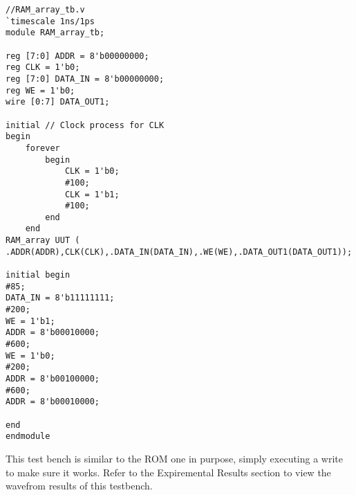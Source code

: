 \documentclass[12pt]{article}
\begin{document}
		\begin{Verbatim}[frame=single, fontsize= \small]
//RAM_array_tb.v
`timescale 1ns/1ps
module RAM_array_tb;

reg [7:0] ADDR = 8'b00000000;
reg CLK = 1'b0;
reg [7:0] DATA_IN = 8'b00000000;
reg WE = 1'b0;
wire [0:7] DATA_OUT1;

initial // Clock process for CLK
begin
	forever 
		begin
			CLK = 1'b0;
			#100;
			CLK = 1'b1; 
			#100;
		end
	end
RAM_array UUT (
.ADDR(ADDR),CLK(CLK),.DATA_IN(DATA_IN),.WE(WE),.DATA_OUT1(DATA_OUT1));

initial begin
#85;
DATA_IN = 8'b11111111;
#200;
WE = 1'b1;
ADDR = 8'b00010000;
#600;
WE = 1'b0;
#200;
ADDR = 8'b00100000;
#600;
ADDR = 8'b00010000;

end
endmodule
		\end{Verbatim}
		This test bench is similar to the ROM one in purpose, simply executing a write to make sure it works. Refer to the Expiremental Results section to view the wavefrom results of this testbench.






\end{document}
